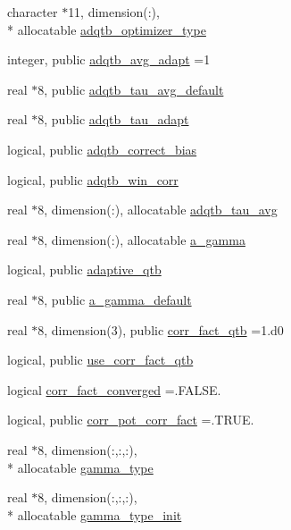 \begin{DoxyCompactItemize}
character $\ast$11, dimension(\-:), \\*
allocatable \hyperlink{classqtb_a794923263a7ad95cc051d7aff5d1f351}{adqtb\-\_\-optimizer\-\_\-type}
\item 
integer, public \hyperlink{classqtb_a3061f570614f506a5d914fc862275c0c}{adqtb\-\_\-avg\-\_\-adapt} =1
\item 
real $\ast$8, public \hyperlink{classqtb_a1905ac2f72584412e56fc1037a57641e}{adqtb\-\_\-tau\-\_\-avg\-\_\-default}
\item 
real $\ast$8, public \hyperlink{classqtb_ae57c1be5fd10880bcbb8452412682dd1}{adqtb\-\_\-tau\-\_\-adapt}
\item 
logical, public \hyperlink{classqtb_a6ee3dbfa7ec54c120520bb6f65eda7ac}{adqtb\-\_\-correct\-\_\-bias}
\item 
logical, public \hyperlink{classqtb_a5b41caa8ef3066475460c3190920f295}{adqtb\-\_\-win\-\_\-corr}
\item 
real $\ast$8, dimension(\-:), allocatable \hyperlink{classqtb_a2ecb6eb3b6006ebb6238554d82b65f4f}{adqtb\-\_\-tau\-\_\-avg}
\item 
real $\ast$8, dimension(\-:), allocatable \hyperlink{classqtb_a4acaca753cf07460ef6c20e7ebf01914}{a\-\_\-gamma}
\item 
logical, public \hyperlink{classqtb_af03b69a3cd5c3be7a38b14ebeed3550e}{adaptive\-\_\-qtb}
\item 
real $\ast$8, public \hyperlink{classqtb_a79aff6e248ffd04b723fd51ef4ef4089}{a\-\_\-gamma\-\_\-default}
\item 
real $\ast$8, dimension(3), public \hyperlink{classqtb_a8d99876f7c7cb5436adea57579d89f7d}{corr\-\_\-fact\-\_\-qtb} =1.d0
\item 
logical, public \hyperlink{classqtb_adb33338a5d19000dc58db2e4829ae74b}{use\-\_\-corr\-\_\-fact\-\_\-qtb}
\item 
logical \hyperlink{classqtb_ac8edcb982290fc47e3bf05877f2b0ecc}{corr\-\_\-fact\-\_\-converged} =.F\-A\-L\-S\-E.
\item 
logical, public \hyperlink{classqtb_a98327ca14b7917a2e422f898e0b57eb7}{corr\-\_\-pot\-\_\-corr\-\_\-fact} =.T\-R\-U\-E.
\item 
real $\ast$8, dimension(\-:,\-:,\-:), \\*
allocatable \hyperlink{classqtb_a7cf4ab603940c782b2a24dfbbdedc7c1}{gamma\-\_\-type}
\item 
real $\ast$8, dimension(\-:,\-:,\-:), \\*
allocatable \hyperlink{classqtb_a22c9890359a07b802b2965b97ffee55f}{gamma\-\_\-type\-\_\-init}

\end{DoxyCompactItemize}
